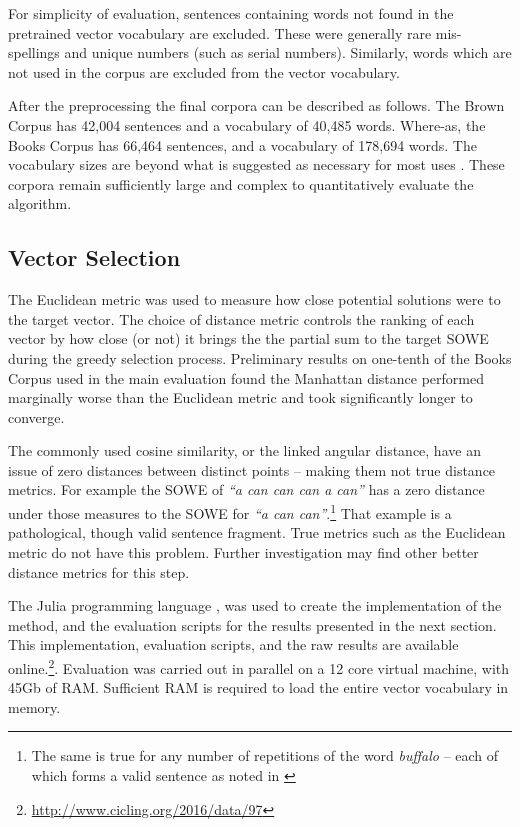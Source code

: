 \documentclass{llncs}
\begin{document}
For simplicity of evaluation, sentences containing words not found in the pretrained vector vocabulary are excluded. These were generally rare mis-spellings and unique numbers (such as serial numbers). Similarly, words which are not used in the corpus are excluded from the vector vocabulary. 

After the preprocessing the final corpora can be described as follows. The Brown Corpus has 42,004 sentences and a vocabulary of 40,485 words. Where-as, the Books Corpus has 66,464 sentences, and a vocabulary of 178,694 words. The vocabulary sizes are beyond what is suggested as necessary for most uses \parencite{nation2006large}. These corpora remain sufficiently large and complex to quantitatively evaluate the algorithm.

\subsection{Vector Selection}
The Euclidean metric was used to measure how close potential solutions were to the target vector. The choice of distance metric controls the ranking of each vector by how close (or not) it brings the the partial sum  to the target SOWE during the greedy selection process. Preliminary results on one-tenth of the Books Corpus used in the main evaluation found the Manhattan distance performed marginally worse than the Euclidean metric and took significantly longer to converge.

The commonly used cosine similarity, or the linked angular distance, have an issue of zero distances between distinct points -- making them not true distance metrics. For example the SOWE of \emph{``a can can can a can''} has a zero distance under those measures to the SOWE for \emph{``a can can''}.\footnote{The same is true for any number of repetitions of the word \emph{buffalo} -- each of which forms a valid sentence as noted in \textcite{tymoczko1995sweet}} That example is a pathological, though valid sentence fragment. True metrics such as the Euclidean metric do not have this problem. Further investigation may find other better distance metrics for this step. 


The Julia programming language \parencite{Julia}, was used to create the implementation of the method, and the evaluation scripts for the results presented in the next section. This implementation, evaluation scripts, and the raw results are available online.\footnote{\url{http://www.cicling.org/2016/data/97}}. Evaluation was carried out in parallel on a 12 core virtual machine, with 45Gb of RAM. Sufficient RAM is required to load the entire vector vocabulary in memory.
\end{document}
